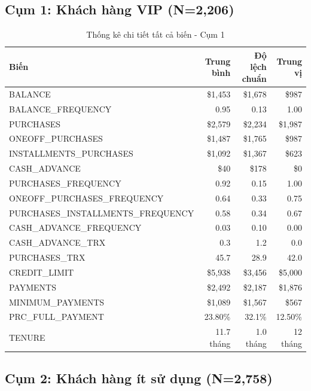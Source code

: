 \subsection{Cụm 1: Khách hàng VIP (N=2,206)}

\begin{table}[H]
\centering
\caption{Thống kê chi tiết tất cả biến - Cụm 1}
\small
\begin{tabular}{|l|r|r|r|}
\hline
\textbf{Biến} & \textbf{Trung bình} & \textbf{Độ lệch chuẩn} & \textbf{Trung vị} \\
\hline
BALANCE & \$1,453 & \$1,678 & \$987 \\
\hline
BALANCE\_FREQUENCY & 0.95 & 0.13 & 1.00 \\
\hline
PURCHASES & \$2,579 & \$2,234 & \$1,987 \\
\hline
ONEOFF\_PURCHASES & \$1,487 & \$1,765 & \$987 \\
\hline
INSTALLMENTS\_PURCHASES & \$1,092 & \$1,367 & \$623 \\
\hline
CASH\_ADVANCE & \$40 & \$178 & \$0 \\
\hline
PURCHASES\_FREQUENCY & 0.92 & 0.15 & 1.00 \\
\hline
ONEOFF\_PURCHASES\_FREQUENCY & 0.64 & 0.33 & 0.75 \\
\hline
PURCHASES\_INSTALLMENTS\_FREQUENCY & 0.58 & 0.34 & 0.67 \\
\hline
CASH\_ADVANCE\_FREQUENCY & 0.03 & 0.10 & 0.00 \\
\hline
CASH\_ADVANCE\_TRX & 0.3 & 1.2 & 0.0 \\
\hline
PURCHASES\_TRX & 45.7 & 28.9 & 42.0 \\
\hline
CREDIT\_LIMIT & \$5,938 & \$3,456 & \$5,000 \\
\hline
PAYMENTS & \$2,492 & \$2,187 & \$1,876 \\
\hline
MINIMUM\_PAYMENTS & \$1,089 & \$1,567 & \$567 \\
\hline
PRC\_FULL\_PAYMENT & 23.80\% & 32.1\% & 12.50\% \\
\hline
TENURE & 11.7 tháng & 1.0 tháng & 12 tháng \\
\hline
\end{tabular}
\end{table}

\subsection{Cụm 2: Khách hàng ít sử dụng (N=2,758)}


